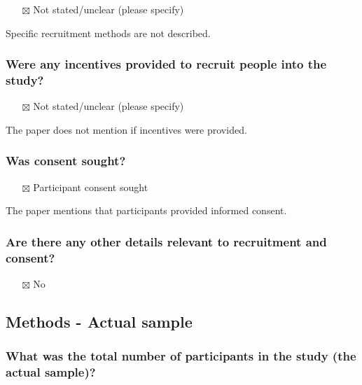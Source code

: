 \documentclass[
  doc, a4paper]{apa7}
\providecommand{\tightlist}{%
  \setlength{\itemsep}{0pt}\setlength{\parskip}{0pt}}
\begin{document}
\begin{itemize}
\tightlist
\item[$\boxtimes$]
  Not stated/unclear (please specify)
\end{itemize}

Specific recruitment methods are not described.

\subsubsection{Were any incentives provided to recruit people into the study?}\label{were-any-incentives-provided-to-recruit-people-into-the-study}

\begin{itemize}
\tightlist
\item[$\boxtimes$]
  Not stated/unclear (please specify)
\end{itemize}

The paper does not mention if incentives were provided.

\subsubsection{Was consent sought?}\label{was-consent-sought}

\begin{itemize}
\tightlist
\item[$\boxtimes$]
  Participant consent sought
\end{itemize}

The paper mentions that participants provided informed consent.

\subsubsection{Are there any other details relevant to recruitment and consent?}\label{are-there-any-other-details-relevant-to-recruitment-and-consent}

\begin{itemize}
\tightlist
\item[$\boxtimes$]
  No
\end{itemize}

\subsection{Methods - Actual sample}\label{methods---actual-sample}

\subsubsection{What was the total number of participants in the study (the actual sample)?}\label{what-was-the-total-number-of-participants-in-the-study-the-actual-sample}
\end{document}
